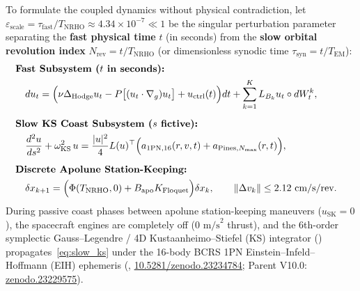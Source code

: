\documentclass[11pt,a4paper,reqno]{article}
\def\bm#1{#1}%
\def\texttt#1{#1}%
\def\mathcal#1{#1}%
\newcommand{\zenodo}[1]{\href{https://doi.org/10.5281/zenodo.#1}{\texttt{10.5281/\allowbreak zenodo.#1}}}
\newcommand{\zenodoshort}[1]{\href{https://doi.org/10.5281/zenodo.#1}{\texttt{zenodo.#1}}}
\theoremstyle{plain}
\theoremstyle{definition}
\theoremstyle{remark}
\numberwithin{equation}{section}
\begin{document}
To formulate the coupled dynamics without physical contradiction, let $\varepsilon_{\text{scale}} = \tau_{\text{fast}} / T_{\text{NRHO}} \approx 4.34 \times 10^{-7} \ll 1$ be the singular perturbation parameter separating the \textbf{fast physical time} $t$ (in seconds) from the \textbf{slow orbital revolution index} $N_{\text{rev}} = t / T_{\text{NRHO}}$ (or dimensionless synodic time $\tau_{\text{syn}} = t / T_{\text{EM}}$):
\begin{subequations}
\label{eq:tikhonov_system}
\begin{align}
  \lefteqn{\text{\textbf{Fast Subsystem ($t$ in seconds):}}} \nonumber \\
  &\quad d u_t = \Big(\nu \Delta_{\text{Hodge}} u_t - \mathcal{P}\big[(u_t \cdot \nabla_g)u_t\big] + \bm{u}_{\text{ctrl}}(t)\Big)dt + \sum_{k=1}^K \mathcal{L}_{B_k} u_t \circ dW_t^k, \label{eq:fast_spde} \\[1.2ex]
  \lefteqn{\text{\textbf{Slow KS Coast Subsystem ($s$ fictive):}}} \nonumber \\
  &\quad \frac{d^2\bm{u}}{ds^2} + \omega_{\text{KS}}^2\,\bm{u} = \frac{|\bm{u}|^2}{4}\mathcal{L}(\bm{u})^\top \Big( \bm{a}_{\text{1PN},16}(\bm{r},\bm{v},t) + \bm{a}_{\text{Pines},N_{\max}}(\bm{r},t) \Big), \label{eq:slow_ks} \\[1.2ex]
  \lefteqn{\text{\textbf{Discrete Apolune Station-Keeping:}}} \nonumber \\
  &\quad \delta\bm{x}_{k+1} = \Big(\bm{\Phi}(T_{\text{NRHO}}, 0) + \bm{B}_{\text{apo}}\bm{K}_{\text{Floquet}}\Big)\delta\bm{x}_k, \qquad \|\Delta\bm{v}_k\| \le 2.12\text{ cm/s/rev}. \label{eq:discrete_sk}
\end{align}
\end{subequations}
During passive coast phases between apolune station-keeping maneuvers ($\bm{u}_{\text{SK}} = \bm{0}$), the spacecraft engines are completely off ($0\text{ m/s}^2$ thrust), and the 6th-order symplectic Gauss--Legendre / 4D Kustaanheimo--Stiefel (KS) integrator (\cite{UnmaniPillarV2026,UnmaniPillarVI2026}) propagates~\eqref{eq:slow_ks} under the 16-body BCRS 1PN Einstein--Infeld--Hoffmann (EIH) ephemeris (\cite{UnmaniPillarVII2026}, \zenodo{23234784}; Parent V10.0: \zenodoshort{23229575}).
\end{document}
